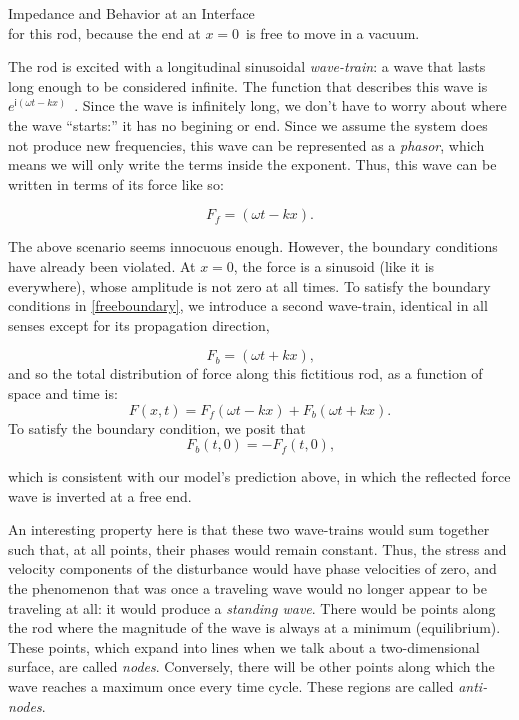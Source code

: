 \documentclass[a4paper,10pt]{report}
\numberwithin{equation}{section}
\begin{document}
{\begin{chapter}
\begin{section}{Impedance and Behavior at an Interface}
\begin{equation}
\end{equation}
for this rod, because the end at $x=0$\  is free to move in a vacuum.
\par
The rod is excited with a longitudinal sinusoidal \emph{wave-train}: a wave that lasts long enough to be considered infinite. The function that describes this wave is $e^{\mathsf{i}(\omega t - kx)}$\  . Since the wave is infinitely long, we don't have to worry about where the wave ``starts:'' it has no begining or end. Since we assume the system does not produce new frequencies, this wave can be represented as a \emph{phasor}, which means we will only write the terms inside the exponent. Thus, this wave can be written in terms of its force like so:
\par
\begin{equation}
F_f = (\omega t - kx) \text{.}
\end{equation}
\par
The above scenario seems innocuous enough. However, the boundary conditions have already been violated. At $x=0$, the force is a sinusoid (like it is everywhere), whose amplitude is not zero at all times. To satisfy the boundary conditions in \eqref{freeboundary}, we introduce a second wave-train, identical in all senses except for its propagation direction,
\par
\begin{equation}
F_b = (\omega t + kx) \text{,}
\end{equation}
and so the total distribution of force along this fictitious rod, as a function of space and time is:
\begin{equation}
F(x, t) = F_f (\omega t - kx) + F_b (\omega t + kx) \text{.}
\end{equation}
To satisfy the boundary condition, we posit that
\begin{equation}
F_b (t, 0) = -F_f (t, 0) \text{,}
\end{equation}
\par
which is consistent with our model's prediction above, in which the reflected force wave is inverted at a free end. \cite[p.~116]{Cremer1973}
\par
An interesting property here is that these two wave-trains would sum together such that, at all points, their phases would remain constant. Thus, the stress and velocity components of the disturbance would have phase velocities of zero, and the phenomenon that was once a traveling wave would no longer appear to be traveling at all: it would produce a \emph{standing wave}. There would be points along the rod where the magnitude of the wave is always at a minimum (equilibrium). These points, which expand into lines when we talk about a two-dimensional surface, are called \emph{nodes}. Conversely, there will be other points along which the wave reaches a maximum once every time cycle. These regions are called \emph{anti-nodes}. 

\end{section}
\end{chapter}}
\end{document}
